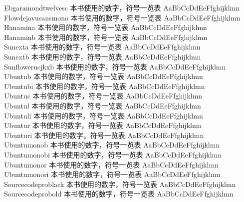 Ebgaramondtwelvesc {\cjk\mktsFontfileEbgaramondtwelvesc{}本书使用的数字，符号一览表 AaBbCcDdEeFfghijklmn}\\
Flowdejavusansmono {\cjk\mktsFontfileFlowdejavusansmono{}本书使用的数字，符号一览表 AaBbCcDdEeFfghijklmn}\\
Hanamina {\cjk\mktsFontfileHanamina{}本书使用的数字，符号一览表 AaBbCcDdEeFfghijklmn}\\
Hanaminb {\cjk\mktsFontfileHanaminb{}本书使用的数字，符号一览表 AaBbCcDdEeFfghijklmn}\\
Sunexta {\cjk\mktsFontfileSunexta{}本书使用的数字，符号一览表 AaBbCcDdEeFfghijklmn}\\
Sunextb {\cjk\mktsFontfileSunextb{}本书使用的数字，符号一览表 AaBbCcDdEeFfghijklmn}\\
Sunflowerucjkxb {\cjk\mktsFontfileSunflowerucjkxb{}本书使用的数字，符号一览表 AaBbCcDdEeFfghijklmn}\\
Ubuntub {\cjk\mktsFontfileUbuntub{}本书使用的数字，符号一览表 AaBbCcDdEeFfghijklmn}\\
Ubuntubi {\cjk\mktsFontfileUbuntubi{}本书使用的数字，符号一览表 AaBbCcDdEeFfghijklmn}\\
Ubuntuc {\cjk\mktsFontfileUbuntuc{}本书使用的数字，符号一览表 AaBbCcDdEeFfghijklmn}\\
Ubuntul {\cjk\mktsFontfileUbuntul{}本书使用的数字，符号一览表 AaBbCcDdEeFfghijklmn}\\
Ubuntuli {\cjk\mktsFontfileUbuntuli{}本书使用的数字，符号一览表 AaBbCcDdEeFfghijklmn}\\
Ubuntur {\cjk\mktsFontfileUbuntur{}本书使用的数字，符号一览表 AaBbCcDdEeFfghijklmn}\\
Ubunturi {\cjk\mktsFontfileUbunturi{}本书使用的数字，符号一览表 AaBbCcDdEeFfghijklmn}\\
Ubuntumonob {\cjk\mktsFontfileUbuntumonob{}本书使用的数字，符号一览表 AaBbCcDdEeFfghijklmn}\\
Ubuntumonobi {\cjk\mktsFontfileUbuntumonobi{}本书使用的数字，符号一览表 AaBbCcDdEeFfghijklmn}\\
Ubuntumonor {\cjk\mktsFontfileUbuntumonor{}本书使用的数字，符号一览表 AaBbCcDdEeFfghijklmn}\\
Ubuntumonori {\cjk\mktsFontfileUbuntumonori{}本书使用的数字，符号一览表 AaBbCcDdEeFfghijklmn}\\
Sourcecodeproblack {\cjk\mktsFontfileSourcecodeproblack{}本书使用的数字，符号一览表 AaBbCcDdEeFfghijklmn}\\
Sourcecodeprobold {\cjk\mktsFontfileSourcecodeprobold{}本书使用的数字，符号一览表 AaBbCcDdEeFfghijklmn}\\
